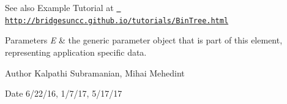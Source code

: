 \begin{DoxySeeAlso}{See also}
Example Tutorial at \href{http://bridgesuncc.github.io/tutorials/BinTree.html}{\texttt{ http\+://bridgesuncc.\+github.\+io/tutorials/\+Bin\+Tree.\+html}}
\end{DoxySeeAlso}

\begin{DoxyParams}{Parameters}
{\em E} & the generic parameter object that is part of this element, representing application specific data.\\
\hline
\end{DoxyParams}
\begin{DoxyAuthor}{Author}
Kalpathi Subramanian, Mihai Mehedint
\end{DoxyAuthor}
\begin{DoxyDate}{Date}
6/22/16, 1/7/17, 5/17/17 
\end{DoxyDate}
